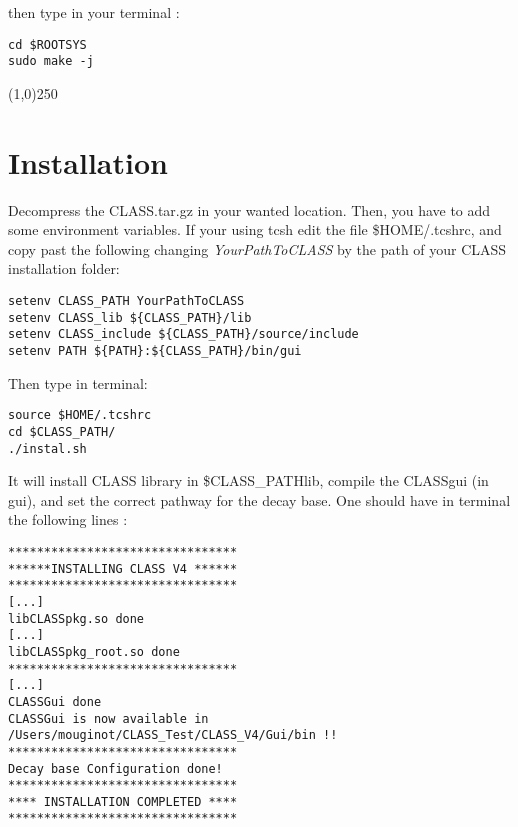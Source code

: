 then type in your terminal : 

\begin{center}
\begin{minipage}{\textwidth}
\begin{lstlisting}[style=terminal]
cd $ROOTSYS
sudo make -j
\end{lstlisting}
\end{minipage}
\end{center}

\begin{center}
\line(1,0){250}
\end{center}


\section{Installation}
Decompress the CLASS.tar.gz in your wanted location. Then, you have to add some environment variables. If your using tcsh  edit the file \$HOME/.tcshrc, and copy past the following  changing \emph{YourPathToCLASS} by the path  of your CLASS installation folder:
\begin{center}
\begin{minipage}{\textwidth}
\begin{lstlisting}
setenv CLASS_PATH YourPathToCLASS
setenv CLASS_lib ${CLASS_PATH}/lib
setenv CLASS_include ${CLASS_PATH}/source/include
setenv PATH ${PATH}:${CLASS_PATH}/bin/gui
\end{lstlisting}
\end{minipage}
\end{center}
 Then type in terminal:
\begin{center}
\begin{minipage}{\textwidth}
\begin{lstlisting}[style=terminal]
source $HOME/.tcshrc
cd $CLASS_PATH/
./instal.sh
\end{lstlisting}
\end{minipage}
\end{center}

It will install CLASS library in \$CLASS\_PATH\/lib, compile the CLASSgui (in gui), and set the correct pathway for the decay base.
One should have in terminal the following lines :
\begin{center}
\begin{minipage}{\textwidth}
\begin{lstlisting}[style=terminal]
********************************
******INSTALLING CLASS V4 ******
********************************
[...]
libCLASSpkg.so done
[...]
libCLASSpkg_root.so done
********************************
[...]
CLASSGui done
CLASSGui is now available in /Users/mouginot/CLASS_Test/CLASS_V4/Gui/bin !!
********************************
Decay base Configuration done!
********************************
**** INSTALLATION COMPLETED ****
********************************
\end{lstlisting}
\end{minipage}
\end{center}



